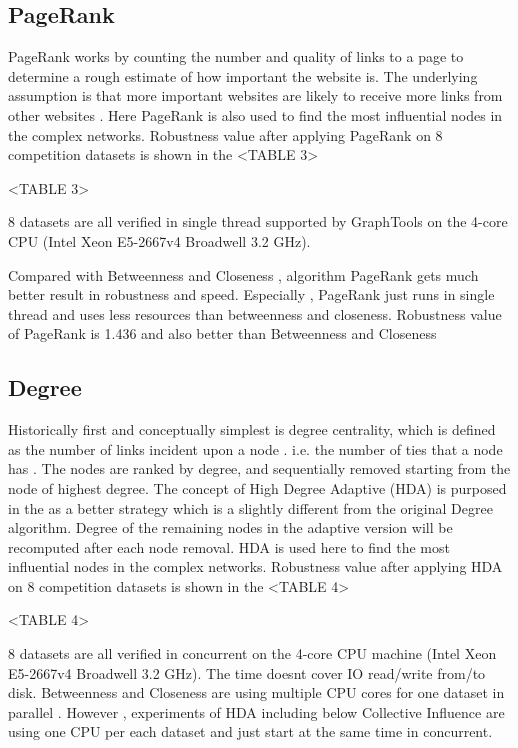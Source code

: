 \documentclass{article}
\begin{document}
	
	\subsection{PageRank}	
	
	
	PageRank works by counting the number and quality of links to a page to determine a rough estimate of how important the website is. The underlying assumption is that more important websites are likely to receive more links from other websites \cite{wikiPageRank}\cite{page1999pagerank}. Here PageRank is also used to find the most influential nodes in the complex networks. Robustness value after applying PageRank on 8 competition datasets is shown in the <TABLE 3>
	
	<TABLE 3>
	
	8 datasets are all verified in single thread supported by GraphTools \cite{peixotographtool2014} on the 4-core CPU (Intel Xeon E5-2667v4 Broadwell 3.2 GHz).
	
	Compared with Betweenness and Closeness , algorithm PageRank gets much better result in robustness and speed. Especially , PageRank just runs in single thread and uses less resources than betweenness and closeness. Robustness value of PageRank is 1.436 and also better than Betweenness and Closeness 
	
	\subsection{Degree}		

	Historically first and conceptually simplest is degree centrality, which is defined as the number of links incident upon a node . i.e. the number of ties that a node has \cite{wikiCentrality}. The nodes are ranked by degree, and sequentially removed starting from the node of highest degree. The concept of High Degree Adaptive (HDA) is purposed in the \cite{morone2015influence} as a better strategy which is a slightly different from the original Degree algorithm. Degree of the remaining nodes in the adaptive version will be recomputed after each node removal. HDA is used here to find the most influential nodes in the complex networks. Robustness value after applying HDA on 8 competition datasets is shown in the <TABLE 4>
	
	<TABLE 4>
	
	8 datasets are all verified in concurrent on the 4-core CPU machine (Intel Xeon E5-2667v4 Broadwell 3.2 GHz). The time doesn\textquotesingle t cover IO read/write from/to disk. Betweenness and Closeness are using multiple CPU cores for one dataset in parallel . However , experiments of HDA including below Collective Influence are using one CPU per each dataset and just start at the same time in concurrent.
	
\end{document}
